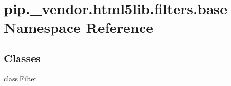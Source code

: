\hypertarget{namespacepip_1_1__vendor_1_1html5lib_1_1filters_1_1base}{}\section{pip.\+\_\+vendor.\+html5lib.\+filters.\+base Namespace Reference}
\label{namespacepip_1_1__vendor_1_1html5lib_1_1filters_1_1base}
\subsection*{Classes}
\begin{DoxyCompactItemize}
\item 
class \hyperlink{classpip_1_1__vendor_1_1html5lib_1_1filters_1_1base_1_1Filter}{Filter}
\end{DoxyCompactItemize}
